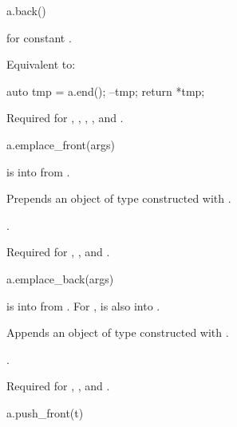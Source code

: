 \begin{itemdecl}
a.back()
\end{itemdecl}

\begin{itemdescr}
\pnum
\result
{} for constant .

\pnum
\effects
Equivalent to:
\begin{codeblock}
auto tmp = a.end();
--tmp;
return *tmp;
\end{codeblock}

\pnum
\remarks
Required for
,
,
,
, and
.
\end{itemdescr}

\begin{itemdecl}
a.emplace_front(args)
\end{itemdecl}

\begin{itemdescr}
\pnum
\result
{}

\pnum
\expects
{} is  into  from .

\pnum
\effects
Prepends an object of type 
constructed with .

\pnum
\returns
{}.

\pnum
\remarks
Required for
,
, and
.
\end{itemdescr}

\begin{itemdecl}
a.emplace_back(args)
\end{itemdecl}

\begin{itemdescr}
\pnum
\result
{}

\pnum
\expects
{} is  into  from .
For ,
 is also  into .

\pnum
\effects
Appends an object of type 
constructed with .

\pnum
\returns
{}.

\pnum
\remarks
Required for
,
, and
.
\end{itemdescr}

\begin{itemdecl}
a.push_front(t)
\end{itemdecl}

